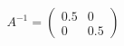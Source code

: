 \documentclass[preview]{standalone}
\begin{document}
\begin{align*}
A^{-1} = \begin{pmatrix} 0.5 & 0 \\ 0 & 0.5 \end{pmatrix}
\end{align*}
\end{document}
